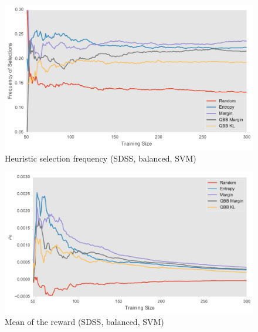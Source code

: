 \begin{figure}[p]
	\centering
	\includegraphics[width=\textwidth]{figures/5_thompson/sdss_br_frequencies}
	\caption[Heuristic selection frequency (SDSS, balanced, SVM)]{
		Heuristic selection frequency (SDSS, balanced, SVM)}
	\label{fig:sdss_br_frequencies}
\end{figure}

\begin{figure}[p]
	\centering
	\includegraphics[width=\textwidth]{figures/5_thompson/sdss_br_mus}
	\caption[Mean of the reward (SDSS, balanced, SVM)]{
		Mean of the reward (SDSS, balanced, SVM)}
\end{figure}

